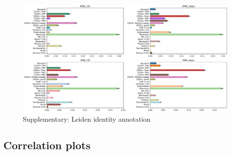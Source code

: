 \documentclass[a4paper]{article}
\begin{document}
\begin{figure}[!htb]
  \centering
  \includegraphics[width=\textwidth]{../figures/hematopoiesis/leiden_identity_proportions.png}
  \caption{Supplementary: Leiden identity annotation}
\end{figure}

\FloatBarrier
\subsection{Correlation plots}
\end{document}
